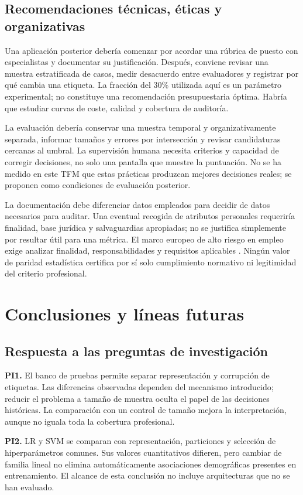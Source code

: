 \section{Recomendaciones técnicas, éticas y organizativas}
Una aplicación posterior debería comenzar por acordar una rúbrica de puesto con especialistas y documentar su justificación. Después, conviene revisar una muestra estratificada de casos, medir desacuerdo entre evaluadores y registrar por qué cambia una etiqueta. La fracción del 30\% utilizada aquí es un parámetro experimental; no constituye una recomendación presupuestaria óptima. Habría que estudiar curvas de coste, calidad y cobertura de auditoría.

La evaluación debería conservar una muestra temporal y organizativamente separada, informar tamaños y errores por intersección y revisar candidaturas cercanas al umbral. La supervisión humana necesita criterios y capacidad de corregir decisiones, no solo una pantalla que muestre la puntuación. No se ha medido en este TFM que estas prácticas produzcan mejores decisiones reales; se proponen como condiciones de evaluación posterior.

La documentación debe diferenciar datos empleados para decidir de datos necesarios para auditar. Una eventual recogida de atributos personales requeriría finalidad, base jurídica y salvaguardias apropiadas; no se justifica simplemente por resultar útil para una métrica. El marco europeo de alto riesgo en empleo exige analizar finalidad, responsabilidades y requisitos aplicables \cite{aiact2024,omnibus2026}. Ningún valor de paridad estadística certifica por sí solo cumplimiento normativo ni legitimidad del criterio profesional.

\chapter{Conclusiones y líneas futuras}
\section{Respuesta a las preguntas de investigación}
\textbf{PI1.} El banco de pruebas permite separar representación y corrupción de etiquetas. Las diferencias observadas dependen del mecanismo introducido; reducir el problema a tamaño de muestra oculta el papel de las decisiones históricas. La comparación con un control de tamaño mejora la interpretación, aunque no iguala toda la cobertura profesional.

\textbf{PI2.} LR y SVM se comparan con representación, particiones y selección de hiperparámetros comunes. Sus valores cuantitativos difieren, pero cambiar de familia lineal no elimina automáticamente asociaciones demográficas presentes en entrenamiento. El alcance de esta conclusión no incluye arquitecturas que no se han evaluado.

